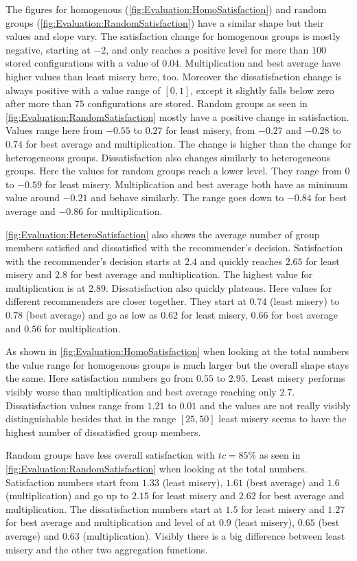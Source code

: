 The figures for homogenous (\autoref{fig:Evaluation:HomoSatisfaction}) and random groups (\autoref{fig:Evaluation:RandomSatisfaction}) have a similar shape but their values and slope vary. The satisfaction change for homogenous groups is mostly negative, starting at $-2$, and only reaches a positive level for more than $100$ stored configurations with a value of $0.04$. Multiplication and best average have higher values than least misery here, too. Moreover the dissatisfaction change is always positive with a value range of $[0,1]$, except it slightly falls below zero after more than $75$ configurations are stored.
Random groups as seen in \autoref{fig:Evaluation:RandomSatisfaction} mostly have a positive change in satisfaction. Values range here from $-0.55$ to $0.27$ for least misery, from $-0.27$ and $-0.28$ to $0.74$ for best average and multiplication. The change is higher than the change for heterogeneous groups. Dissatisfaction also changes similarly to heterogeneous groups. Here the values for random groups reach a lower level. They range from $0$ to $-0.59$ for least misery. Multiplication and best average both have as minimum value around $-0.21$ and behave similarly. The range goes down to $-0.84$ for best average and $-0.86$ for multiplication.

\autoref{fig:Evaluation:HeteroSatisfaction} also shows the average number of group members satisfied and dissatisfied with the recommender's decision. Satisfaction with the recommender's decision starts at $2.4$ and quickly reaches $2.65$ for least misery and $2.8$ for best average and multiplication. The highest value for multiplication is at $2.89$. Dissatisfaction also quickly plateaus. Here values for different recommenders are closer together. They start at $0.74$ (least misery) to $0.78$ (best average) and go as low as $0.62$ for least misery, $0.66$ for best average and $0.56$ for multiplication.

As shown in \autoref{fig:Evaluation:HomoSatisfaction} when looking at the total numbers the value range for homogenous groups is much larger but the overall shape stays the same. Here satisfaction numbers go from $0.55$ to $2.95$. Least misery performs visibly worse than multiplication and best average reaching only $2.7$. Dissatisfaction values range from $1.21$ to $0.01$ and the values are not really visibly distinguishable besides that in the range $[25,50]$ least misery seems to have the highest number of dissatisfied group members.

Random groups have less overall satisfaction with $tc = 85\%$ as seen in \autoref{fig:Evaluation:RandomSatisfaction} when looking at the total numbers. Satisfaction numbers start from $1.33$ (least misery), $1.61$ (best average) and $1.6$ (multiplication) and go up to $2.15$ for least misery and $2.62$ for best average and multiplication. The dissatisfaction numbers start at $1.5$ for least misery and $1.27$ for best average and multiplication and level of at $0.9$ (least misery), $0.65$ (best average) and $0.63$ (multiplication). Visibly there is a big difference between least misery and the other two aggregation functions.

